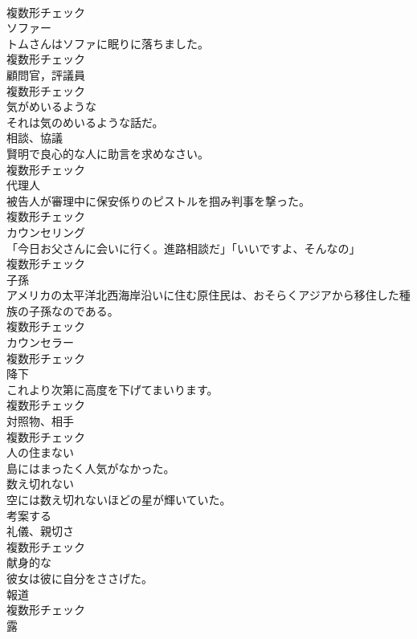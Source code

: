 \documentclass[8pt]{extreport}
\begin{document}
\begin{CJK}{UTF8}{min}
\\	複数形チェック
\\	[名詞]	ソファー	
\\	トムさんはソファに眠りに落ちました。	
\\	複数形チェック
\\	[名詞]	顧問官，評議員	
\\	複数形チェック
\\	[形容詞]	気がめいるような	
\\	それは気のめいるような話だ。	
\\	[名詞]	相談、協議	
\\	賢明で良心的な人に助言を求めなさい。	
\\	複数形チェック
\\	[名詞]	代理人	
\\	被告人が審理中に保安係りのピストルを掴み判事を撃った。	
\\	複数形チェック
\\	[名詞]	カウンセリング	
\\	「今日お父さんに会いに行く。進路相談だ」「いいですよ、そんなの」	
\\	複数形チェック
\\	[名詞]	子孫	
\\	アメリカの太平洋北西海岸沿いに住む原住民は、おそらくアジアから移住した種族の子孫なのである。	
\\	複数形チェック
\\	[名詞]	カウンセラー	
\\	複数形チェック
\\	[名詞]	降下	
\\	これより次第に高度を下げてまいります。	
\\	複数形チェック
\\	[名詞]	対照物、相手	
\\	複数形チェック
\\	[形容詞]	人の住まない	
\\	島にはまったく人気がなかった。	
\\	[形容詞]	数え切れない	
\\	空には数え切れないほどの星が輝いていた。	
\\	[動詞]	考案する	
\\	[名詞]	礼儀、親切さ	
\\	複数形チェック
\\	[形容詞]	献身的な	
\\	彼女は彼に自分をささげた。	
\\	[名詞]	報道	
\\	複数形チェック
\\	[名詞]	露	

\end{CJK}
\end{document}
